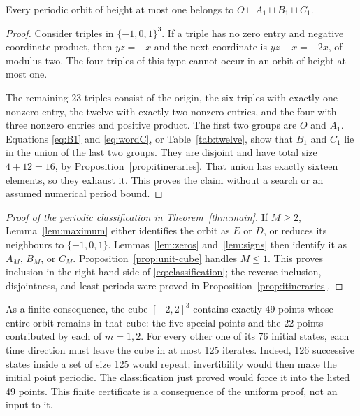 \begin{proposition}\label{prop:unit-cube}
Every periodic orbit of height at most one belongs to
$O\sqcup A_1\sqcup B_1\sqcup C_1$.
\end{proposition}
\begin{proof}
Consider triples in $\{-1,0,1\}^3$. If a triple has no zero
entry and negative coordinate product, then $yz=-x$ and the next
coordinate is $yz-x=-2x$, of modulus two. The four triples of
this type cannot occur in an orbit of height at most one.

The remaining $23$ triples consist of the origin, the six triples
with exactly one nonzero entry, the twelve with exactly two nonzero
entries, and the four with three nonzero entries and positive product.
The first two groups are $O$ and $A_1$. Equations
\eqref{eq:B1} and \eqref{eq:wordC}, or
Table~\ref{tab:twelve}, show that $B_1$ and $C_1$ lie in
the union of the last two groups. They are disjoint and have total
size $4+12=16$, by Proposition~\ref{prop:itineraries}. That
union has exactly sixteen elements, so they exhaust it. This proves
the claim without a search or an assumed numerical period bound.
\end{proof}

\begin{proof}[Proof of the periodic classification in Theorem~\ref{thm:main}]
If $M\geq2$, Lemma~\ref{lem:maximum} either identifies the
orbit as $E$ or $D$, or reduces its neighbours to
$\{-1,0,1\}$. Lemmas~\ref{lem:zeros} and~\ref{lem:signs}
then identify it as $A_M$, $B_M$, or $C_M$.
Proposition~\ref{prop:unit-cube} handles $M\leq1$.
This proves inclusion in the right-hand side of
\eqref{eq:classification}; the reverse inclusion, disjointness, and
least periods were proved in Proposition~\ref{prop:itineraries}.
\end{proof}

As a finite consequence, the cube $[-2,2]^3$ contains exactly
49 points whose entire orbit remains in that cube: the five special
points and the $22$ points contributed by each of $m=1,2$.
For every other one of its 76 initial states, each time direction
must leave the cube in at most 125 iterates. Indeed, 126 successive
states inside a set of size 125 would repeat; invertibility would
then make the initial point periodic. The classification just proved
would force it into the listed 49 points. This finite certificate is
a consequence of the uniform proof, not an input to it.
